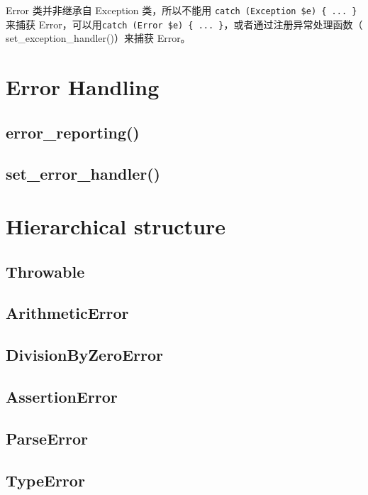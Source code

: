 Error 类并非继承自 Exception 类，所以不能用 \texttt{catch (Exception \$e) \{ ... \}} 来捕获 Error，可以用\texttt{catch (Error \$e) \{ ... \}}，或者通过注册异常处理函数（ set\_exception\_handler()）来捕获 Error。

\section{Error Handling}

\subsection{error\_reporting()}


\subsection{set\_error\_handler()}



\section{Hierarchical structure}


\subsection{Throwable}



\subsection{ArithmeticError}



\subsection{DivisionByZeroError}


\subsection{AssertionError}


\subsection{ParseError}


\subsection{TypeError}







